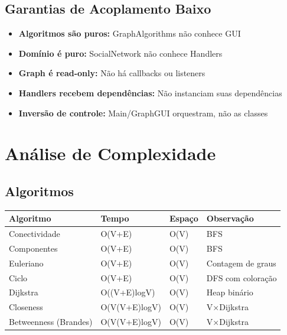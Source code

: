 \documentclass[12pt,a4paper]{article}
\begin{document}
    \subsection{Garantias de Acoplamento Baixo}

    \begin{itemize}
        \item \textbf{Algoritmos são puros:} GraphAlgorithms não conhece GUI
        \item \textbf{Domínio é puro:} SocialNetwork não conhece Handlers
        \item \textbf{Graph é read-only:} Não há callbacks ou listeners
        \item \textbf{Handlers recebem dependências:} Não instanciam suas dependências
        \item \textbf{Inversão de controle:} Main/GraphGUI orquestram, não as classes
    \end{itemize}

    \newpage

    \section{Análise de Complexidade}

    \subsection{Algoritmos}

    \begin{table}[h]
        \centering
        \begin{tabular}{|l|l|l|l|}
            \hline
            \textbf{Algoritmo} & \textbf{Tempo} & \textbf{Espaço} & \textbf{Observação} \\
            \hline
            Conectividade & O(V+E) & O(V) & BFS \\
            \hline
            Componentes & O(V+E) & O(V) & BFS \\
            \hline
            Euleriano & O(V+E) & O(V) & Contagem de graus \\
            \hline
            Ciclo & O(V+E) & O(V) & DFS com coloração \\
            \hline
            Dijkstra & O((V+E)logV) & O(V) & Heap binário \\
            \hline
            Closeness & O(V(V+E)logV) & O(V) & V×Dijkstra \\
            \hline
            Betweenness (Brandes) & O(V(V+E)logV) & O(V) & V×Dijkstra \\
            \hline
        \end{tabular}
    \end{table}
\end{document}
